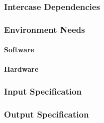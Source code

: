 \subsubsection{Intercase Dependencies}

\subsubsection{Environment Needs}

\paragraph{Software}

\paragraph{Hardware}

\subsubsection{Input Specification}

\subsubsection{Output Specification}

